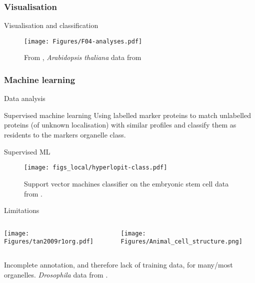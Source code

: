 \subsubsection*{Visualisation}
\label{sec:viz}

\begin{frame}{Visualisation and classification}
  \begin{figure}
    \centering
    \texttt{[image: Figures/F04-analyses.pdf]}
    \caption{From \cite{Gatto:2010}, \textit{Arabidopsis thaliana} data
      from \cite{Dunkley:2006}}
  \end{figure}   
\end{frame}

\subsubsection*{Machine learning}
\label{sec:ml}

\begin{frame}{Data analysis}
  \begin{centering}

    \begin{block}{Supervised machine learning}    
      Using labelled marker proteins to match unlabelled proteins (of
      unknown localisation) with similar profiles and classify them as
      residents to the markers organelle class.
    \end{block}
  \end{centering}
\end{frame}


\begin{frame}{Supervised ML}
  \begin{figure}[h]
    \centering 
    \texttt{[image: figs\_local/hyperlopit-class.pdf]}
    \caption{Support vector machines classifier on the embryonic stem
      cell data from \cite{Christoforou:2016}.}
  \end{figure}
\end{frame}


\begin{frame}{Limitations}
  \begin{columns}[t]
    \begin{column}[T]{0.43\textwidth}
      \begin{centering}
        \texttt{[image: Figures/tan2009r1org.pdf]}
      \end{centering} 
    \end{column}
    \begin{column}[T]{0.56\textwidth}      
      \texttt{[image: Figures/Animal\_cell\_structure.png]}
    \end{column}
  \end{columns}          
  Incomplete annotation, and therefore lack of training data, for
  many/most organelles. \textit{Drosophila} data from \cite{Tan2009}.
\end{frame}


